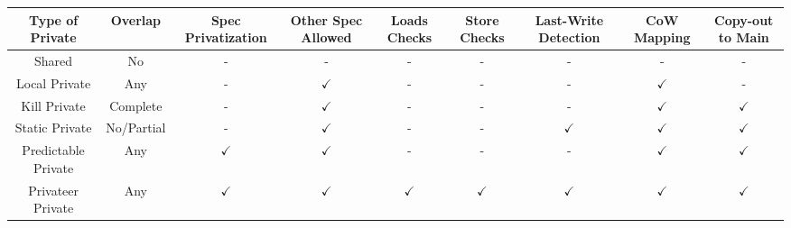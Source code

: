 \centering
\tiny
\begin{tabular}{|c|c|c|c|c|c|c|c|c|}
  \hline
  Type of Private &
  Overlap         &
  Spec Privatization &
  Other Spec Allowed    &
  Loads Checks  &
  Store Checks    &
  Last-Write Detection &
  CoW Mapping &
  Copy-out to Main \\

 \hline
 Shared & No & - & - & - & - & - & - & - \\
 \hline
 Local Private & Any & - & $\checkmark$ & - & - & - & $\checkmark$ & - \\
 \hline
 Kill Private & Complete & - & $\checkmark$ & - & - & - & $\checkmark$ &
$\checkmark$ \\
 \hline
 Static Private & No/Partial & - & $\checkmark$ & - & - &
 $\checkmark$ & $\checkmark$ & $\checkmark$ \\
 \hline
 Predictable Private & Any & $\checkmark$ & $\checkmark$ & - & - & - & $\checkmark$ &
$\checkmark$ \\
 \hline
 Privateer Private & Any & $\checkmark$ & $\checkmark$ & $\checkmark$ & $\checkmark$ &
 $\checkmark$ & $\checkmark$ & $\checkmark$ \\
 \hline
\end{tabular}

